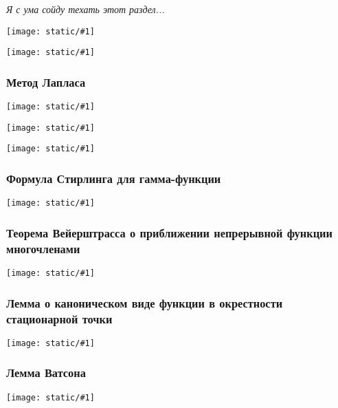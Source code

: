 \documentclass{article}
\def\image#1{\texttt{[image: static/\#1]}}
\begin{document}
\textit{Я с ума сойду техать этот раздел...}

\image{loc_lapl_1.jpg}

\image{loc_lapl_2.jpg}

\subsubsection{Метод Лапласа}

\image{met_lapl_1.jpg}

\image{met_lapl_2.jpg}

\image{met_lapl_3.jpg}

\subsubsection{Формула Стирлинга для гамма-функции}

\image{stirl_gamm.jpg}

\subsubsection{Теорема Вейерштрасса о приближении непрерывной функции многочленами}

\image{veiersht_lap.jpg}

\subsubsection{Лемма о каноническом виде функции в окрестности стационарной точки}

\image{kanon_vd.jpg}

\subsubsection{Лемма Ватсона}

\image{watson_l.jpg}


\newpage
\end{document}
